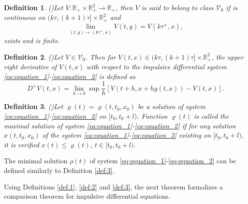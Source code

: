 \documentclass[10pt,letterpaper]{article}
\newtheorem{definition}{Definition}
\begin{document}
\begin{definition}{\rm (\cite{Laksh1989})}\label{def:1}
    Let $V : \mathbb{R}_+ \times \mathbb{R}^2_+\to \mathbb{R}_+$, then $V$ is said to belong to class $\mathcal{V}_0$ if is continuous on $(k\tau, (k + 1)\tau] \times \mathbb{R}^2_+$ and\begin{equation}\label{eq:equation_9}
       \lim\limits_{(t, y) \to (k\tau^+, x)} V(t, y) = V(k\tau^+, x), 
    \end{equation} exists and is finite.
\end{definition}

\begin{definition}{\rm (\cite{Laksh1989})}\label{def:2} Let $V \in \mathcal{V}_0$. Then for $V(t, x) \in (k\tau, (k + 1)\tau] \times \mathbb{R}^2_+$, the upper right derivative of $V(t,x)$ with respect to the impulsive differential system \eqref{eq:equation_1}-\eqref{eq:equation_2} is defined as
\begin{equation}\label{eq:equation_10}
    D^+ V(t,x) = \lim_{h \to 0} \sup{\frac{1}{h}\left[V(t+h,x+hg(t,x))-V(t,x)\right]}.
\end{equation}
\end{definition}
\begin{definition}{\rm (\cite{Laksh1989})}\label{def:3} Let $\varrho(t) = \varrho(t, t_0, x_0)$ be a solution of system \eqref{eq:equation_1}-\eqref{eq:equation_2} on $[t_0, t_0 + l)$. Function $\varrho(t)$ is called the maximal solution of system \eqref{eq:equation_1}-\eqref{eq:equation_2} if for
any solution $x(t, t_0, x_0)$ of the system \eqref{eq:equation_1}-\eqref{eq:equation_2} existing on $[t_0, t_0 + l)$, it is verified $x(t) \leq \varrho(t)
$, $t \in [t_0, t_0 + l)$.  
\end{definition}

The minimal solution $\rho(t)$ of system \eqref{eq:equation_1}-\eqref{eq:equation_2} can be   defined similarly to Definition \eqref{def:3}.

Using Definitions \eqref{def:1}, \eqref{def:2} and \eqref{def:3}, the next theorem formalizes a comparison theorem for impulsive differential equations. 
\end{document}
